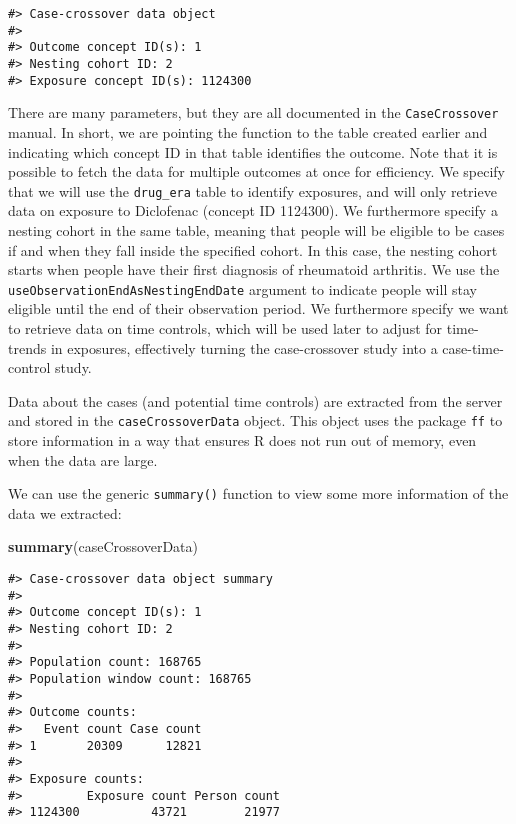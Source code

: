 \documentclass[]{article}
\newenvironment{Shaded}{\begin{snugshade}}{\end{snugshade}}
\newcommand{\KeywordTok}[1]{\textcolor[rgb]{0.13,0.29,0.53}{\textbf{#1}}}
\newcommand{\NormalTok}[1]{#1}
\begin{document}
\begin{verbatim}
#> Case-crossover data object
#> 
#> Outcome concept ID(s): 1
#> Nesting cohort ID: 2
#> Exposure concept ID(s): 1124300
\end{verbatim}

There are many parameters, but they are all documented in the
\texttt{CaseCrossover} manual. In short, we are pointing the function to
the table created earlier and indicating which concept ID in that table
identifies the outcome. Note that it is possible to fetch the data for
multiple outcomes at once for efficiency. We specify that we will use
the \texttt{drug\_era} table to identify exposures, and will only
retrieve data on exposure to Diclofenac (concept ID 1124300). We
furthermore specify a nesting cohort in the same table, meaning that
people will be eligible to be cases if and when they fall inside the
specified cohort. In this case, the nesting cohort starts when people
have their first diagnosis of rheumatoid arthritis. We use the
\texttt{useObservationEndAsNestingEndDate} argument to indicate people
will stay eligible until the end of their observation period. We
furthermore specify we want to retrieve data on time controls, which
will be used later to adjust for time-trends in exposures, effectively
turning the case-crossover study into a case-time-control study.

Data about the cases (and potential time controls) are extracted from
the server and stored in the \texttt{caseCrossoverData} object. This
object uses the package \texttt{ff} to store information in a way that
ensures R does not run out of memory, even when the data are large.

We can use the generic \texttt{summary()} function to view some more
information of the data we extracted:

\begin{Shaded}
\begin{Highlighting}[]
\KeywordTok{summary}\NormalTok{(caseCrossoverData)}
\end{Highlighting}
\end{Shaded}

\begin{verbatim}
#> Case-crossover data object summary
#> 
#> Outcome concept ID(s): 1
#> Nesting cohort ID: 2
#> 
#> Population count: 168765
#> Population window count: 168765
#> 
#> Outcome counts:
#>   Event count Case count
#> 1       20309      12821
#> 
#> Exposure counts:
#>         Exposure count Person count
#> 1124300          43721        21977
\end{verbatim}
\end{document}
